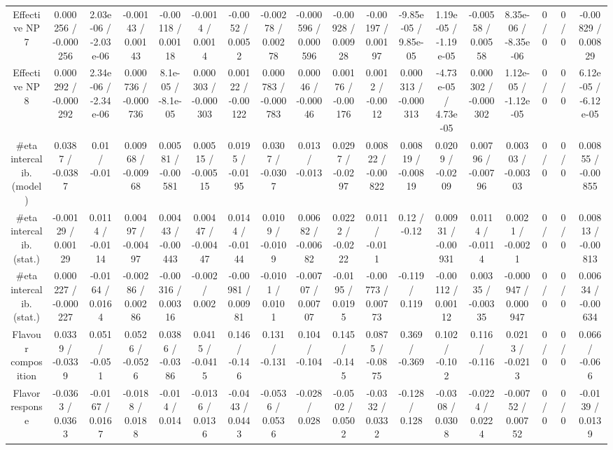 \documentclass[10pt]{article}
\begin{document}
\begin{table}[htbp]
\begin{center}
\begin{tabular}{|c|c|c|c|c|c|c|c|c|c|c|c|c|c|c|c|c|c|}
  Effective NP 7 & 0.000256 / -0.000256 & 2.03e-06 / -2.03e-06 & -0.00143 / 0.00143 & -0.00118 / 0.00118 & -0.0014 / 0.0014 & -0.0052 / 0.0052 & -0.00278 / 0.00278 & -0.000596 / 0.000596 & -0.00928 / 0.00928 & -0.00197 / 0.00197 & -9.85e-05 / 9.85e-05 & 1.19e-05 / -1.19e-05 & -0.00558 / 0.00558 & 8.35e-06 / -8.35e-06 & 0 / 0 & 0 / 0 & -0.00829 / 0.00829 \\ 
  Effective NP 8 & 0.000292 / -0.000292 & 2.34e-06 / -2.34e-06 & 0.000736 / -0.000736 & 8.1e-05 / -8.1e-05 & 0.000303 / -0.000303 & 0.00122 / -0.00122 & 0.000783 / -0.000783 & 0.00046 / -0.00046 & 0.00176 / -0.00176 & 0.0012 / -0.0012 & 0.000313 / -0.000313 & -4.73e-05 / 4.73e-05 & 0.000302 / -0.000302 & 1.12e-05 / -1.12e-05 & 0 / 0 & 0 / 0 & 6.12e-05 / -6.12e-05 \\ 
  #eta intercalib. (model) & 0.0387 / -0.0387 & 0.01 / -0.01 & 0.00968 / -0.00968 & 0.00581 / -0.00581 & 0.00515 / -0.00515 & 0.0195 / -0.0195 & 0.0307 / -0.0307 & 0.013 / -0.013 & 0.0297 / -0.0297 & 0.00822 / -0.00822 & 0.00819 / -0.00819 & 0.0209 / -0.0209 & 0.00796 / -0.00796 & 0.00303 / -0.00303 & 0 / 0 & 0 / 0 & 0.00855 / -0.00855 \\ 
  #eta intercalib. (stat.) & -0.00129 / 0.00129 & 0.0114 / -0.0114 & 0.00497 / -0.00497 & 0.00443 / -0.00443 & 0.00447 / -0.00447 & 0.0144 / -0.0144 & 0.0109 / -0.0109 & 0.00682 / -0.00682 & 0.0222 / -0.0222 & 0.011 / -0.011 & 0.12 / -0.12 & 0.00931 / -0.00931 & 0.0114 / -0.0114 & 0.0021 / -0.0021 & 0 / 0 & 0 / 0 & 0.00813 / -0.00813 \\ 
  #eta intercalib. (stat.) & 0.000227 / -0.000227 & -0.0164 / 0.0164 & -0.00286 / 0.00286 & -0.00316 / 0.00316 & -0.002 / 0.002 & -0.00981 / 0.00981 & -0.0101 / 0.0101 & -0.00707 / 0.00707 & -0.0195 / 0.0195 & -0.00773 / 0.00773 & -0.119 / 0.119 & -0.00112 / 0.00112 & 0.00335 / -0.00335 & -0.000947 / 0.000947 & 0 / 0 & 0 / 0 & 0.00634 / -0.00634 \\ 
  Flavour composition & 0.0339 / -0.0339 & 0.051 / -0.051 & 0.0526 / -0.0526 & 0.0386 / -0.0386 & 0.0415 / -0.0415 & 0.146 / -0.146 & 0.131 / -0.131 & 0.104 / -0.104 & 0.145 / -0.145 & 0.0875 / -0.0875 & 0.369 / -0.369 & 0.102 / -0.102 & 0.116 / -0.116 & 0.0213 / -0.0213 & 0 / 0 & 0 / 0 & 0.066 / -0.066 \\ 
  Flavor response & -0.0363 / 0.0363 & -0.0167 / 0.0167 & -0.0188 / 0.0188 & -0.014 / 0.014 & -0.0136 / 0.0136 & -0.0443 / 0.0443 & -0.0536 / 0.0536 & -0.028 / 0.028 & -0.0502 / 0.0502 & -0.0332 / 0.0332 & -0.128 / 0.128 & -0.0308 / 0.0308 & -0.0224 / 0.0224 & -0.00752 / 0.00752 & 0 / 0 & 0 / 0 & -0.0139 / 0.0139 \\ 

\end{tabular}
\end{center}
\end{table}
\end{document}
